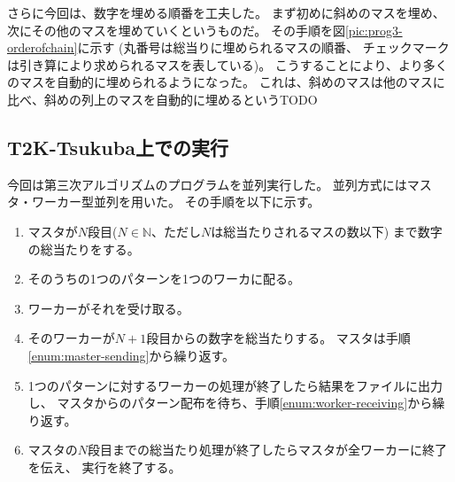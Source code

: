 さらに今回は、数字を埋める順番を工夫した。
まず初めに斜めのマスを埋め、次にその他のマスを埋めていくというものだ。
その手順を図\ref{pic:prog3-orderofchain}に示す
(丸番号は総当りに埋められるマスの順番、
チェックマークは引き算により求められるマスを表している)。
こうすることにより、より多くのマスを自動的に埋められるようになった。
これは、斜めのマスは他のマスに比べ、斜めの列上のマスを自動的に埋めるというTODO


\subsection{T2K-Tsukuba上での実行}
今回は第三次アルゴリズムのプログラムを並列実行した。
並列方式にはマスタ・ワーカー型並列を用いた。
その手順を以下に示す。
\begin{enumerate}
\item マスタが$N$段目($N \in \mathbb{N}$、ただし$N$は総当たりされるマスの数以下)
まで数字の総当たりをする。
\item そのうちの1つのパターンを1つのワーカに配る。 \label{enum:master-sending}
\item ワーカーがそれを受け取る。 \label{enum:worker-receiving}
\item そのワーカーが$N+1$段目からの数字を総当たりする。
マスタは手順\ref{enum:master-sending}から繰り返す。
\item 1つのパターンに対するワーカーの処理が終了したら結果をファイルに出力し、
マスタからのパターン配布を待ち、手順\ref{enum:worker-receiving}から繰り返す。
\item マスタの$N$段目までの総当たり処理が終了したらマスタが全ワーカーに終了を伝え、
実行を終了する。
\end{enumerate}
